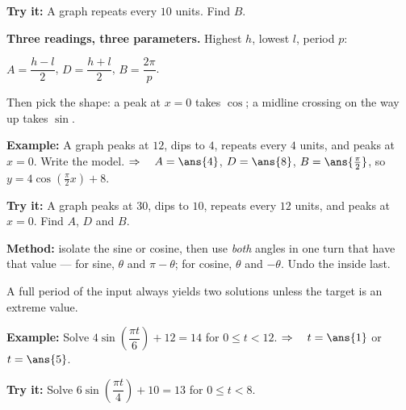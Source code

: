 \documentclass[12pt]{article}
\begin{document}
\begin{tryitbox}
\textbf{Try it:} \quad A graph repeats every $10$ units. Find $B$.\\[2pt]
\end{tryitbox}


\begin{formulabox}
\textbf{Three readings, three parameters.} Highest $h$, lowest $l$, period $p$:\par
$A = \dfrac{h-l}{2}$, \quad $D = \dfrac{h+l}{2}$, \quad $B = \dfrac{2\pi}{p}$.\par
Then pick the shape: a peak at $x = 0$ takes $\cos$; a midline crossing on the way up takes $\sin$.
\end{formulabox}

\begin{examplebox}
\textbf{Example:} \quad A graph peaks at $12$, dips to $4$, repeats every $4$ units, and peaks at $x = 0$. Write the model.
$\Rightarrow\quad A = \ans{4}$, $D = \ans{8}$, $B = \ans{\tfrac{\pi}{2}}$, so $y = 4\cos\!\left(\tfrac{\pi}{2}x\right) + 8$.
\end{examplebox}

\begin{tryitbox}
\textbf{Try it:} \quad A graph peaks at $30$, dips to $10$, repeats every $12$ units, and peaks at $x = 0$. Find $A$, $D$ and $B$.\\[2pt]
\end{tryitbox}


\begin{formulabox}
\textbf{Method:} isolate the sine or cosine, then use \emph{both} angles in one turn that have that value --- for sine, $\theta$ and $\pi - \theta$; for cosine, $\theta$ and $-\theta$. Undo the inside last.\par
A full period of the input always yields two solutions unless the target is an extreme value.
\end{formulabox}

\begin{examplebox}
\textbf{Example:} \quad Solve $4\sin\!\left(\dfrac{\pi t}{6}\right) + 12 = 14$ for $0 \le t < 12$.
$\Rightarrow\quad t = \ans{1}$ or $t = \ans{5}$.
\end{examplebox}

\begin{tryitbox}
\textbf{Try it:} \quad Solve $6\sin\!\left(\dfrac{\pi t}{4}\right) + 10 = 13$ for $0 \le t < 8$.\\[2pt]
\end{tryitbox}
\end{document}
